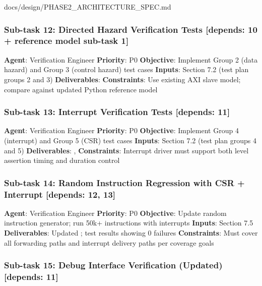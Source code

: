 \begin{relocated}{docs/design/PHASE2_ARCHITECTURE_SPEC.md}
\subsubsection{Sub-task 12: Directed Hazard Verification Tests
{[}depends: 10 + reference model sub-task 1{]}}\label{ds:ch:phase2-architecture:sub-task-12-directed-hazard-verification-tests-depends-10-reference-model-sub-task-1}

\textbf{Agent}: Verification Engineer \textbf{Priority}: P0
\textbf{Objective}: Implement Group 2 (data hazard) and Group 3 (control
hazard) test cases \textbf{Inputs}: Section 7.2 (test plan groups 2 and
3) \textbf{Deliverables}: 
\textbf{Constraints}: Use existing AXI slave model; compare against
updated Python reference model

\subsubsection{Sub-task 13: Interrupt Verification Tests {[}depends:
11{]}}\label{ds:ch:phase2-architecture:sub-task-13-interrupt-verification-tests-depends-11}

\textbf{Agent}: Verification Engineer \textbf{Priority}: P0
\textbf{Objective}: Implement Group 4 (interrupt) and Group 5 (CSR) test
cases \textbf{Inputs}: Section 7.2 (test plan groups 4 and 5)
\textbf{Deliverables}: ,
 \textbf{Constraints}: Interrupt driver
must support both level assertion timing and duration control

\subsubsection{Sub-task 14: Random Instruction Regression with CSR +
Interrupt {[}depends: 12, 13{]}}\label{ds:ch:phase2-architecture:sub-task-14-random-instruction-regression-with-csr-interrupt-depends-12-13}

\textbf{Agent}: Verification Engineer \textbf{Priority}: P0
\textbf{Objective}: Update random instruction generator; run 50k+
instructions with interrupts \textbf{Inputs}: Section 7.5
\textbf{Deliverables}: Updated ;
test results showing 0 failures \textbf{Constraints}: Must cover all
forwarding paths and interrupt delivery paths per coverage goals

\subsubsection{Sub-task 15: Debug Interface Verification (Updated)
{[}depends: 11{]}}\label{ds:ch:phase2-architecture:sub-task-15-debug-interface-verification-updated-depends-11}


\end{relocated}
